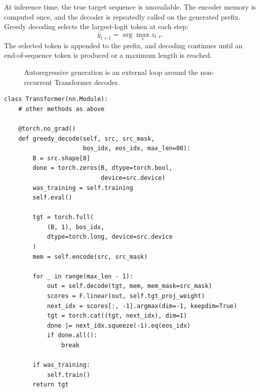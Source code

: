\documentclass[11pt]{article}
\begin{document}
At inference time, the true target sequence is unavailable. The encoder memory is computed once, and the decoder is repeatedly called on the generated prefix. Greedy decoding selects the largest-logit token at each step:
\begin{equation}
  \hat y_{t+1}=\arg\max_{v} z_{t,v}.
\end{equation}
The selected token is appended to the prefix, and decoding continues until an end-of-sequence token is produced or a maximum length is reached.

\begin{figure}[htbp]
\centering
{}
\caption{Autoregressive generation is an external loop around the non-recurrent Transformer decoder.}
\label{fig:inference}
\end{figure}

\begin{lstlisting}[caption={Greedy autoregressive decoding.},label={lst:greedy}]
class Transformer(nn.Module):
    # other methods as above

    @torch.no_grad()
    def greedy_decode(self, src, src_mask,
                      bos_idx, eos_idx, max_len=80):
        B = src.shape[0]
        done = torch.zeros(B, dtype=torch.bool,
                           device=src.device)
        was_training = self.training
        self.eval()

        tgt = torch.full(
            (B, 1), bos_idx,
            dtype=torch.long, device=src.device
        )
        mem = self.encode(src, src_mask)

        for _ in range(max_len - 1):
            out = self.decode(tgt, mem, mem_mask=src_mask)
            scores = F.linear(out, self.tgt_proj_weight)
            next_idx = scores[:, -1].argmax(dim=-1, keepdim=True)
            tgt = torch.cat((tgt, next_idx), dim=1)
            done |= next_idx.squeeze(-1).eq(eos_idx)
            if done.all():
                break

        if was_training:
            self.train()
        return tgt
\end{lstlisting}
\end{document}
